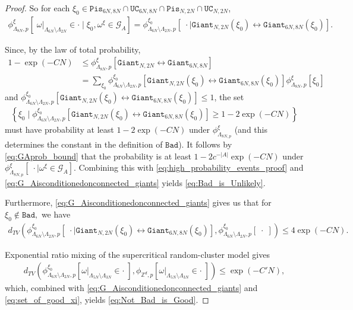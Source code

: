 \documentclass[article,11pt,reqno]{amsart}
\newcommand{\cc}{\leftrightarrow}
\newcommand{\xiA}{\xi_0}
\begin{document}
\begin{proof}
So for each $\xi_0 \in\mathtt{Pis}_{6N, 8N}\cap \mathtt{UC}_{6N,8N}\cap \mathtt{Pis}_{N,2N} \cap\mathtt{UC}_{N,2N}$, 
\begin{align}
\label{eq:G_Aisconditionedonconnected_giants}
\phi^{\xi}_{\Lambda_{8N},p}[\; \omega\vert_{\Lambda_{6N}\setminus \Lambda_{2N}} \in \cdot \mid \xiA,\omega^{\xi}\in \mathcal{G}_A]=\phi_{\Lambda_{6N}\setminus \Lambda_{2N},p}^{\xiA}[\; \cdot \mid \mathtt{Giant}_{N,2N}(\xiA)\cc \mathtt{Giant}_{6N,8N}(\xiA)].
\end{align}



Since, by the law of total probability,
\begin{align*}
 1-\exp(-CN)&\leq 
\phi^{\xi}_{\Lambda_{8N},p}[\mathtt{Giant}_{N,2N}\cc \mathtt{Giant}_{6N,8N} ]\\
&=\sum_{\xiA} \phi_{\Lambda_{6N}\setminus \Lambda_{2N},p}^{\xiA}[\mathtt{Giant}_{N,2N}(\xiA) \cc \mathtt{Giant}_{6N,8N}(\xiA)] \phi^{\xi}_{\Lambda_{8N},p}[\xiA]
\end{align*}
and $\phi_{\Lambda_{6N}\setminus \Lambda_{2N},p}^{\xiA}[ \mathtt{Giant}_{N,2N}(\xiA) \cc \mathtt{Giant}_{6N,8N}(\xiA)]\leq 1$, the set 
\begin{align*} 
   \left \{ \xiA  \mid \phi_{\Lambda_{6N}\setminus \Lambda_{2N},p}^{\xiA}[\mathtt{Giant}_{N,2N}(\xiA) \cc \mathtt{Giant}_{6N,8N}(\xiA)]\geq 1-2\exp(-CN) \right \}
\end{align*}must have probability at least $1-2\exp(-CN)$ under $\phi^{\xi}_{\Lambda_{8N,p}}$ (and this determines the constant in the definition of $\mathtt{Bad}$).
It follows by \eqref{eq:GAprob_bound} that the probability is at least $1-2c^{-|A|}\exp(-CN)$ under $\phi ^{\xi}_{\Lambda_{8N,p}}[\;\cdot\mid \omega^{\xi}\in\mathcal{G}_A].$  Combining this with \eqref{eq:high_probability_events_proof} and \eqref{eq:G_Aisconditionedonconnected_giants}  yields \eqref{eq:Bad_is_Unlikely}.

Furthermore, \eqref{eq:G_Aisconditionedonconnected_giants} gives us that for $\xiA\not \in \mathtt{Bad},$ we have
\begin{align}\label{eq:set_of_good_xi}
d_{TV}(\phi_{\Lambda_{6N}\setminus \Lambda_{2N},p}^{\xiA}[\; \cdot \mid  \mathtt{Giant}_{N,2N}(\xiA) \cc \mathtt{Giant}_{6N,8N}(\xiA)],\phi_{\Lambda_{6N}\setminus \Lambda_{2N},p}^{\xiA}[\; \cdot\;])\leq 4\exp(-CN).
\end{align}


Exponential ratio mixing of the supercritical random-cluster model gives  
\begin{align}\label{eq:exp_ratio_boundary_proof}
    d_{TV}(\phi_{\Lambda_{6N}\setminus \Lambda_{2N},p}^{\xiA}[\omega|_{\Lambda_{5N}\setminus \Lambda_{3N}}\in \cdot \;],\phi_{\mathbb{Z}^d,p}[\omega|_{\Lambda_{5N}\setminus \Lambda_{3N}}\in \cdot \;])\leq \exp(-C'N), 
\end{align}
which, combined with \eqref{eq:G_Aisconditionedonconnected_giants} and \eqref{eq:set_of_good_xi}, yields \eqref{eq:Not_Bad_is_Good}.




\end{proof}
\end{document}
